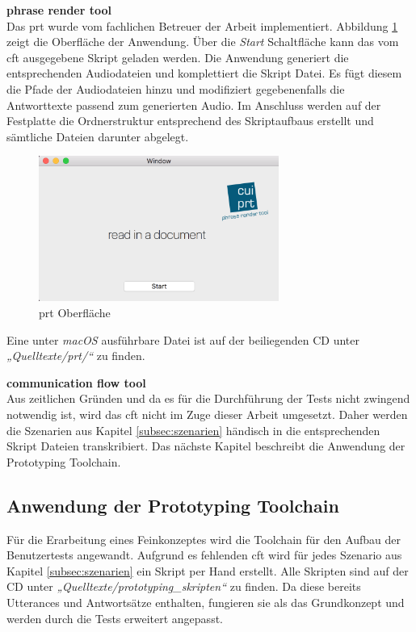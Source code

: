 \textbf{phrase render tool}\\
Das \ac{prt} wurde vom fachlichen Betreuer der Arbeit implementiert. Abbildung \ref{fig:prt-gui} zeigt die Oberfläche der Anwendung. Über die \textit{Start} Schaltfläche kann das vom \ac{cft} ausgegebene Skript geladen werden. Die Anwendung generiert die entsprechenden Audiodateien und komplettiert die Skript Datei. Es fügt diesem die Pfade der Audiodateien hinzu und modifiziert gegebenenfalls die Antworttexte passend zum generierten Audio. Im Anschluss werden auf der Festplatte die Ordnerstruktur entsprechend des Skriptaufbaus erstellt und sämtliche Dateien darunter abgelegt. 

\begin{figure}[!htb]
    \centering
    \includegraphics[width=0.7\textwidth]{bilder/3_prtGui.png}
    \caption{prt Oberfläche}
    \label{fig:prt-gui}
\end{figure}

Eine unter \textit{macOS} ausführbare Datei ist auf der beiliegenden CD unter \textit{„Quelltexte/prt/“} zu finden.

\textbf{communication flow tool}\\
Aus zeitlichen Gründen und da es für die Durchführung der Tests nicht zwingend notwendig ist, wird das \ac{cft} nicht im Zuge dieser Arbeit umgesetzt. Daher werden die Szenarien aus Kapitel \ref{subsec:szenarien} händisch in die entsprechenden Skript Dateien transkribiert. Das nächste Kapitel beschreibt die Anwendung der Prototyping Toolchain.

\subsection{Anwendung der Prototyping Toolchain}
\label{subsec:prototyping-tests}
Für die Erarbeitung eines Feinkonzeptes wird die Toolchain für den Aufbau der Benutzertests angewandt. Aufgrund es fehlenden \ac{cft} wird für jedes Szenario aus Kapitel \ref{subsec:szenarien} ein Skript per Hand erstellt. Alle Skripten sind auf der CD unter \textit{„Quelltexte/prototyping\_skripten“} zu finden. Da diese bereits Utterances und Antwortsätze enthalten, fungieren sie als das Grundkonzept und werden durch die Tests erweitert \bzw angepasst.  

